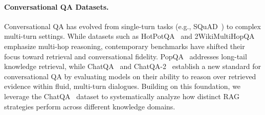\documentclass[11pt]{article}
\begin{document}


\paragraph{Conversational QA Datasets.} \label{sec:conversational_qa}
Conversational QA has evolved from single-turn tasks (e.g., SQuAD~\cite{rajpurkar_squad_2016}) to complex multi-turn settings. While datasets such as HotPotQA~\cite{yang_hotpotqa_2018} and 2WikiMultiHopQA~\cite{ho_constructing_2020} emphasize multi-hop reasoning, contemporary benchmarks have shifted their focus toward 
retrieval and conversational fidelity. 
PopQA~\cite{mallen_when_2023} addresses long-tail knowledge retrieval, while ChatQA~\cite{liu_chatqa_2024} and ChatQA-2~\cite{xu_chatqa_2025} establish a new standard for conversational QA by evaluating models on their ability to reason over retrieved evidence within fluid, multi-turn dialogues. Building on this foundation, we leverage the ChatQA~\cite{liu_chatqa_2024} dataset to systematically analyze how distinct RAG strategies perform across different knowledge domains.
\end{document}
